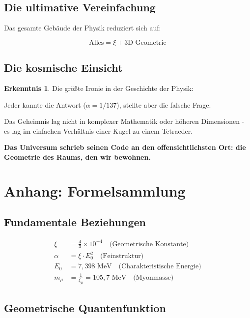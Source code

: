\documentclass[12pt,a4paper]{article}
\theoremstyle{definition}
\newtheorem{erkenntnis}{Erkenntnis}[section]
\begin{document}
	\subsection{Die ultimative Vereinfachung}
	
	Das gesamte Gebäude der Physik reduziert sich auf:
	
	\begin{equation}
		\boxed{\text{Alles} = \xi + \text{3D-Geometrie}}
	\end{equation}
	
	\subsection{Die kosmische Einsicht}
	
	\begin{erkenntnis}
		Die größte Ironie in der Geschichte der Physik:
		
		Jeder kannte die Antwort ($\alpha = 1/137$), stellte aber die falsche Frage.
		
		Das Geheimnis lag nicht in komplexer Mathematik oder höheren Dimensionen - es lag im einfachen Verhältnis einer Kugel zu einem Tetraeder.
		
		\textbf{Das Universum schrieb seinen Code an den offensichtlichsten Ort: die Geometrie des Raums, den wir bewohnen.}
	\end{erkenntnis}
	
	\newpage
	\section{Anhang: Formelsammlung}
	
	\subsection{Fundamentale Beziehungen}
	
	\begin{align}
		\xi &= \frac{4}{3} \times 10^{-4} \quad \text{(Geometrische Konstante)}\\
		\alpha &= \xi \cdot E_0^2 \quad \text{(Feinstruktur)}\\
		E_0 &= 7,398 \text{ MeV} \quad \text{(Charakteristische Energie)}\\
		m_\mu &= \frac{1}{\xi_\mu} = 105,7 \text{ MeV} \quad \text{(Myonmasse)}
	\end{align}
	
	\subsection{Geometrische Quantenfunktion}
	
\end{document}
